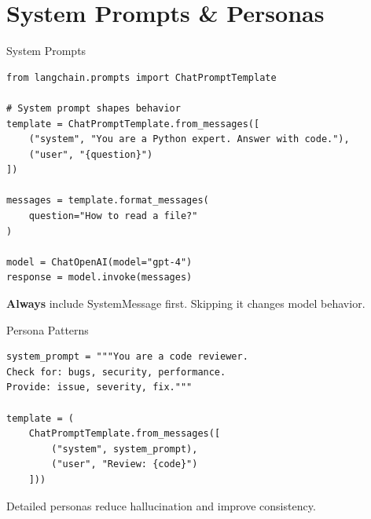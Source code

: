 \documentclass[aspectratio=169,11pt]{beamer}
\begin{document}
\section{System Prompts \& Personas}

\begin{frame}[fragile]{System Prompts}
  \begin{codebox}
    \begin{lstlisting}
from langchain.prompts import ChatPromptTemplate

# System prompt shapes behavior
template = ChatPromptTemplate.from_messages([
    ("system", "You are a Python expert. Answer with code."),
    ("user", "{question}")
])

messages = template.format_messages(
    question="How to read a file?"
)

model = ChatOpenAI(model="gpt-4")
response = model.invoke(messages)
    \end{lstlisting}
  \end{codebox}

  \vspace{0.08cm}
  \begin{warningbox}
    \textbf{Always} include SystemMessage first. Skipping it changes model behavior.
  \end{warningbox}
\end{frame}

\begin{frame}[fragile]{Persona Patterns}
  \begin{codebox}
    \begin{lstlisting}
system_prompt = """You are a code reviewer.
Check for: bugs, security, performance.
Provide: issue, severity, fix."""

template = (
    ChatPromptTemplate.from_messages([
        ("system", system_prompt),
        ("user", "Review: {code}")
    ]))
    \end{lstlisting}
  \end{codebox}

  \begin{tipbox}
    Detailed personas reduce hallucination and improve consistency.
  \end{tipbox}
\end{frame}
\end{document}
